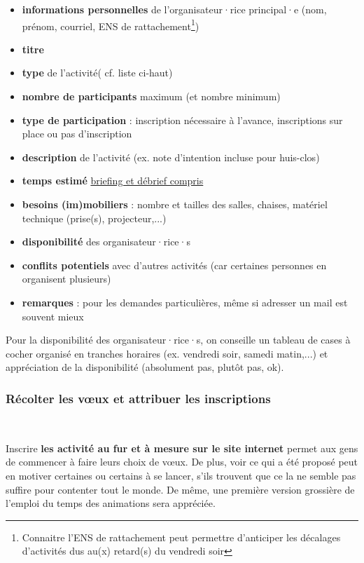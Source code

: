 \begin{itemize}
    \item \textbf{informations personnelles} de l'organisateur·rice principal·e (nom, prénom, courriel, ENS de rattachement\footnote{Connaitre l'ENS de rattachement peut permettre d'anticiper les décalages d'activités dus au(x) retard(s) du vendredi soir})
    \item \textbf{titre}
    \item \textbf{type} de l'activité( cf. liste ci-haut)
    \item \textbf{nombre de participants} maximum (et nombre minimum)
    \item \textbf{type de participation} : inscription nécessaire à l'avance, inscriptions sur place ou pas d'inscription
    \item \textbf{description} de l'activité (ex. note d'intention incluse pour huis-clos)
    \item \textbf{temps estimé} \underline{briefing et débrief compris}
    \item \textbf{besoins (im)mobiliers} : nombre et tailles des salles, chaises, matériel technique (prise(s), projecteur,...)
    \item \textbf{disponibilité} des organisateur·rice·s
    \item \textbf{conflits potentiels} avec d'autres activités (car certaines personnes en organisent plusieurs)
    \item \textbf{remarques} : pour les demandes particulières, même si adresser un mail est souvent mieux
\end{itemize}

Pour la disponibilité des organisateur·rice·s, on conseille un tableau de cases à cocher organisé en tranches horaires (ex. vendredi soir, samedi matin,...) et appréciation de la disponibilité (absolument pas, plutôt pas, ok).

\subsubsection{Récolter les vœux et attribuer les inscriptions}~

\begin{Afaire}{}{}
Inscrire \textbf{les activité au fur et à mesure sur le site internet} permet aux gens de commencer à faire leurs choix de vœux. De plus, voir ce qui a été proposé peut en motiver certaines ou certains à se lancer, s'ils trouvent que ce la ne semble pas suffire pour contenter tout le monde. De même, une première version grossière de l'emploi du temps des animations sera appréciée.
\end{Afaire}

